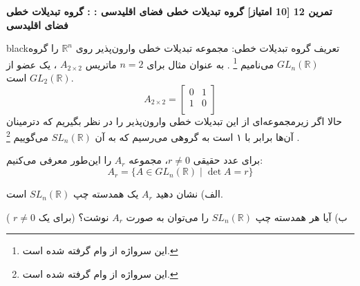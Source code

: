 \documentclass{article}
\newenvironment{exercise}[3][\unskip]{%
	\par
	\noindent
	\textbf{تمرین
		#1
		[#2 امتیاز] 
		\def\temp{#3}\ifx\temp\empty
		: 
		\else
		: #3 \vspace{0.5em} \\ \noindent
		\fi
}}{}
\begin{document}
\begin{exercise}[12]{10}{گروه تبدیلات خطی فضای اقلیدسی}
	\vspace{-1em}
	\begin{boxes}{black}{تعریف گروه‌ تبدیلات خطی:}
		مجموعه تبدیلات خطی وارون‌پذیر روی 
		$\mathbb{R}^n$ 
		را گروه 
		$GL_n(\mathbb{R})$ 
		می‌نامیم
		\footnote{این سرواژه از 
			وام گرفته شده است.
		}
		. به عنوان مثال برای 
		$n=2$ 
		ماتریس 
		$A_{2 \times 2}$ 
		، یک عضو از 
		$GL_2(\mathbb{R})$ 
		است.
		\begin{equation*}
			A_{2 \times 2} = \left[\begin{matrix}0&1\\1&0\\\end{matrix}\right]
		\end{equation*}
		حالا اگر زیرمجموعه‌ای از این تبدیلات خطی وارون‌پذیر را در نظر بگیریم که دترمینان آن‌ها برابر با ۱ است به گروهی می‌رسیم که به آن 
		$SL_n(\mathbb{R})$ 
		می‌گوییم
		\footnote{این سرواژه از  
			وام گرفته شده است.
		}
		. 
	\end{boxes} 
	\noindent
	\vspace{0.7em}
	برای عدد حقیقی 
	$r \neq 0$، 
	مجموعه 
	$A_r$ 
	را این‌طور معرفی می‌کنیم:
	\begin{equation*}
		A_r= \{A\in GL_n(\mathbb{R})  \;|\;  \det A =r\}
	\end{equation*}
	
	\noindent
	الف) نشان دهید 
	$A_r$ 
	یک همدسته چپ 
	$SL_n(\mathbb{R})$ 
	است. 

\noindent
\vspace{0.25em}
	ب) آیا هر همدسته چپ 
	$SL_n(\mathbb{R})$ 
	را می‌توان به صورت 
	$A_r$ 
	نوشت؟ (برای یک 
	$r\neq 0$
	)
	\\
\end{exercise}
\end{document}
